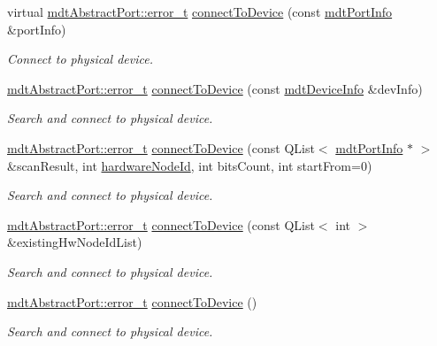 \begin{DoxyCompactItemize}
virtual \hyperlink{classmdt_abstract_port_ad4121bb930c95887e77f8bafa065a85e}{mdt\-Abstract\-Port\-::error\-\_\-t} \hyperlink{classmdt_device_modbus_a3ca2a84163fed1380cbc8859a6b70db0}{connect\-To\-Device} (const \hyperlink{classmdt_port_info}{mdt\-Port\-Info} \&port\-Info)
\begin{DoxyCompactList}\small\item\em Connect to physical device. \end{DoxyCompactList}\item 
\hyperlink{classmdt_abstract_port_ad4121bb930c95887e77f8bafa065a85e}{mdt\-Abstract\-Port\-::error\-\_\-t} \hyperlink{classmdt_device_modbus_a093c6407ee69c4c7696a0c71d0acd88d}{connect\-To\-Device} (const \hyperlink{classmdt_device_info}{mdt\-Device\-Info} \&dev\-Info)
\begin{DoxyCompactList}\small\item\em Search and connect to physical device. \end{DoxyCompactList}\item 
\hyperlink{classmdt_abstract_port_ad4121bb930c95887e77f8bafa065a85e}{mdt\-Abstract\-Port\-::error\-\_\-t} \hyperlink{classmdt_device_modbus_a323b16687f448a4e45eb0b313635b77f}{connect\-To\-Device} (const Q\-List$<$ \hyperlink{classmdt_port_info}{mdt\-Port\-Info} $\ast$ $>$ \&scan\-Result, int \hyperlink{classmdt_device_modbus_ab5e3f041a24d895dbe739a9229d4fd27}{hardware\-Node\-Id}, int bits\-Count, int start\-From=0)
\begin{DoxyCompactList}\small\item\em Search and connect to physical device. \end{DoxyCompactList}\item 
\hyperlink{classmdt_abstract_port_ad4121bb930c95887e77f8bafa065a85e}{mdt\-Abstract\-Port\-::error\-\_\-t} \hyperlink{classmdt_device_modbus_a08100215b37c0922ed177d1f99d07e97}{connect\-To\-Device} (const Q\-List$<$ int $>$ \&existing\-Hw\-Node\-Id\-List)
\begin{DoxyCompactList}\small\item\em Search and connect to physical device. \end{DoxyCompactList}\item 
\hyperlink{classmdt_abstract_port_ad4121bb930c95887e77f8bafa065a85e}{mdt\-Abstract\-Port\-::error\-\_\-t} \hyperlink{classmdt_device_modbus_abfcab17fbf05aab7843ae689316dd01f}{connect\-To\-Device} ()
\begin{DoxyCompactList}\small\item\em Search and connect to physical device. \end{DoxyCompactList}\item 

\end{DoxyCompactItemize}

